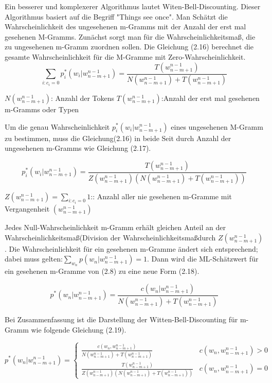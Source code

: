 Ein besserer und komplexerer Algorithmus lautet Witen-Bell-Discounting.
Dieser Algorithmus basiert auf die Begriff "Things see once". Man Sch\"atzt die Wahrscheinlichkeit des ungesehenen m-Gramms mit der Anzahl der erst mal gesehenen M-Gramms. Zun\"achst sorgt man f\"ur die Wahrscheinlichkeitsma\ss , die zu ungesehenen m-Gramm zuordnen sollen. Die Gleichung (2.16) berechnet die  gesamte Wahrscheinlichkeit f\"ur  die M-Gramme mit Zero-Wahrscheinlichkeit.
\begin{equation}
\label{equation:witten_bell_01}
\sum_{i:c_{i}=0}p_{i}^{*}(w_{i}|w_{n-m+1}^{n-1})=\frac{T(w_{n-m+1}^{n-1})}{N(w_{n-m+1}^{n-1})+T(w_{n-m+1}^{n-1})}
\end{equation}

$N(w_{n-m+1}^{n-1})$: Anzahl der Tokens
$T(w_{n-m+1}^{n-1})$:Anzahl der erst mal gesehenen m-Gramms oder Typen

Um die genau Wahrscheinlichkeit $p_{i}^{*}(w_{i}|w_{n-m+1}^{n-1})$ eines ungesehenen M-Gramm zu bestimmen, muss die Gleichung(2.16) in beide Seit durch Anzahl der ungesehenen m-Gramms wie Gleichung (2.17).

\begin{equation}
\label{equation:witten_bell_02}
p_{i}^{*}(w_{i}|w_{n-m+1}^{n-1})=\frac{T(w_{n-m+1}^{n-1})}{Z(w_{n-m+1}^{n-1})(N(w_{n-m+1}^{n-1})+T(w_{n-m+1}^{n-1}))}
\end{equation}

$Z(w_{n-m+1}^{n-1})=\sum_{i:c_{i}=0}1$:: Anzahl aller nie gesehenen m-Gramme mit Vergangenheit $(w_{n-m+1}^{n-1})$

Jedes Null-Wahrscheinlichkeit m-Gramm erh\"alt gleichen Anteil an der Wahrscheinlichkeitsma\ss (Division der Wahrscheinlichkeitsma\ss durch $Z(w_{n-m+1}^{n-1})$.
Die Wahrscheinlichkeit f\"ur ein gesehenen m-Gramme \"andert sich entsprechend; dabei muss gelten:$\sum_{w_{n}}p(w_{n}|w_{n-m+1}^{n-1})=1$. Dann wird die ML-Sch\"atzwert  f\"ur ein gesehenen m-Gramme von (2.8) zu eine neue Form (2.18). 

\begin{equation}
\label{equation:witten_bell_03}
p^{*}(w_{n}|w_{n-m+1}^{n-1})=\frac{c(w_{n}|w_{n-m+1}^{n-1})}{N(w_{n-m+1}^{n-1})+T(w_{n-m+1}^{n-1})}
\end{equation}

Bei Zusammenfassung ist die Darstellung der Witten-Bell-Discounting f\"ur m-Gramm wie folgende Gleichung (2.19).

\begin{equation}
\label{equationo:witten_bell_04}
p^{*}(w_{n}|w_{n-m+1}^{n-1})=\begin{cases}
\frac{c(w_{n},w_{n-m+1}^{n-1})}{N(w_{n-m+1}^{n-1})+T(w_{n-m+1}^{n-1})} & c(w_{n},w_{n-m+1}^{n-1})>0 \\
\frac{T(w_{n-m+1}^{n-1})}{Z(w_{n-m+1}^{n-1})(N(w_{n-m+1}^{n-1})+T(w_{n-m+1}^{n-1}))} & c(w_{n},w_{n-m+1}^{n-1})=0 
\end{cases}
\end{equation}
